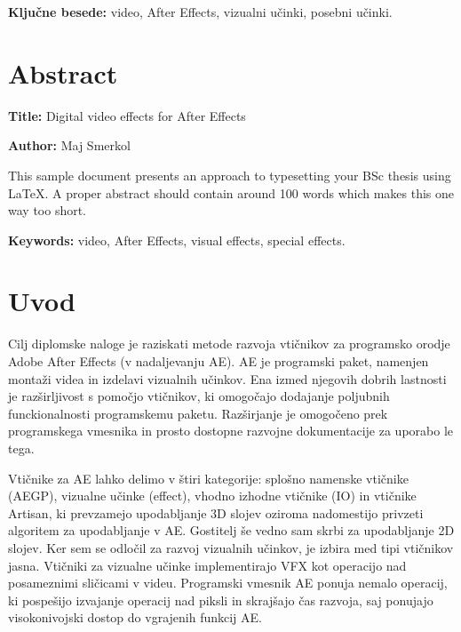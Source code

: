 \documentclass[a4paper, 12pt]{book}
\newcommand{\ttitleEn}{Digital video effects for After Effects}
\newcommand{\tauthor}{Maj Smerkol}
\newcommand{\tkeywords}{video, After Effects, vizualni učinki, posebni učinki}
\newcommand{\tkeywordsEn}{video, After Effects, visual effects, special effects}
\newcommand{\clearemptydoublepage}{\newpage{\pagestyle{empty}\cleardoublepage}}
\begin{document}
\bigskip

\noindent\textbf{Ključne besede:} \tkeywords.
\clearemptydoublepage

\chapter*{Abstract}

\noindent\textbf{Title:} \ttitleEn
\bigskip

\noindent\textbf{Author:} \tauthor
\bigskip

\noindent This sample document presents an approach to typesetting your BSc thesis using \LaTeX. 
A proper abstract should contain around 100 words which makes this one way too short.
\bigskip

\noindent\textbf{Keywords:} \tkeywordsEn.
\clearemptydoublepage

\mainmatter
\setcounter{page}{1}
\pagestyle{fancy}

\chapter{Uvod}

Cilj diplomske naloge je raziskati metode razvoja vtičnikov za programsko orodje Adobe After Effects (v nadaljevanju AE). 
AE je programski paket, namenjen montaži videa in izdelavi vizualnih učinkov. 
Ena izmed njegovih dobrih lastnosti je razširljivost s pomočjo vtičnikov, ki omogočajo dodajanje poljubnih funckionalnosti programskemu paketu. 
Razširjanje je omogočeno prek programskega vmesnika in prosto dostopne razvojne dokumentacije za uporabo le tega. 

Vtičnike za AE lahko delimo v štiri kategorije: 
splošno namenske vtičnike (AEGP), 
vizualne učinke (effect), 
vhodno izhodne vtičnike (IO) in 
vtičnike Artisan, ki prevzamejo upodabljanje 3D slojev oziroma nadomestijo privzeti algoritem za upodabljanje v AE. 
Gostitelj še vedno sam skrbi za upodabljanje 2D slojev. 
Ker sem se odločil za razvoj vizualnih učinkov, je izbira med tipi vtičnikov jasna. 
Vtičniki za vizualne učinke implementirajo VFX kot operacijo nad posameznimi sličicami v videu. 
Programski vmesnik AE ponuja nemalo operacij, ki pospešijo izvajanje operacij nad piksli in skrajšajo čas razvoja, saj ponujajo visokonivojski dostop do vgrajenih funkcij AE. 
\end{document}
